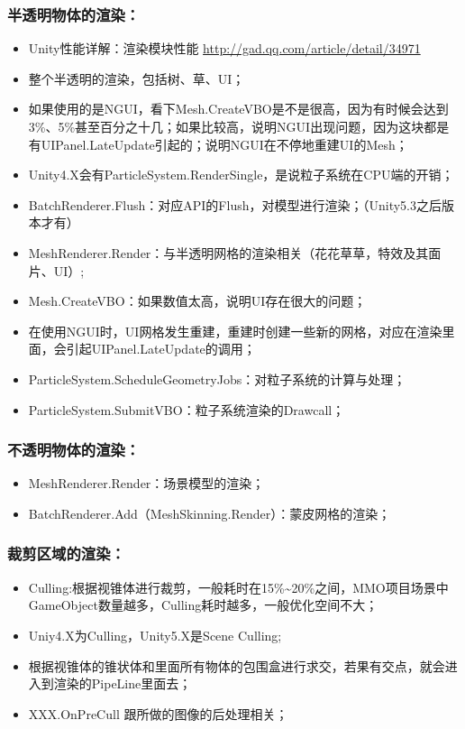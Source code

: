 \documentclass[9pt, b5paper]{article}
\begin{document}
\subsubsection{半透明物体的渲染：}
\label{sec:org5390cbd}
\begin{itemize}
\item Unity性能详解：渲染模块性能 \url{http://gad.qq.com/article/detail/34971}
\item 整个半透明的渲染，包括树、草、UI；
\item 如果使用的是NGUI，看下Mesh.CreateVBO是不是很高，因为有时候会达到3\%、5\%甚至百分之十几；如果比较高，说明NGUI出现问题，因为这块都是有UIPanel.LateUpdate引起的；说明NGUI在不停地重建UI的Mesh；
\item Unity4.X会有ParticleSystem.RenderSingle，是说粒子系统在CPU端的开销；
\item BatchRenderer.Flush：对应API的Flush，对模型进行渲染；（Unity5.3之后版本才有）
\item MeshRenderer.Render：与半透明网格的渲染相关（花花草草，特效及其面片、UI）;
\item Mesh.CreateVBO：如果数值太高，说明UI存在很大的问题；
\item 在使用NGUI时，UI网格发生重建，重建时创建一些新的网格，对应在渲染里面，会引起UIPanel.LateUpdate的调用；
\item ParticleSystem.ScheduleGeometryJobs：对粒子系统的计算与处理；
\item ParticleSystem.SubmitVBO：粒子系统渲染的Drawcall；
\end{itemize}
\subsubsection{不透明物体的渲染：}
\label{sec:org3ac79f6}
\begin{itemize}
\item MeshRenderer.Render：场景模型的渲染；
\item BatchRenderer.Add（MeshSkinning.Render）：蒙皮网格的渲染；
\end{itemize}
\subsubsection{裁剪区域的渲染：}
\label{sec:org8613ac0}
\begin{itemize}
\item Culling:根据视锥体进行裁剪，一般耗时在15\%\textasciitilde{}20\%之间，MMO项目场景中GameObject数量越多，Culling耗时越多，一般优化空间不大；
\item Uniy4.X为Culling，Unity5.X是Scene Culling;
\item 根据视锥体的锥状体和里面所有物体的包围盒进行求交，若果有交点，就会进入到渲染的PipeLine里面去；
\item XXX.OnPreCull 跟所做的图像的后处理相关；
\end{itemize}
\end{document}
